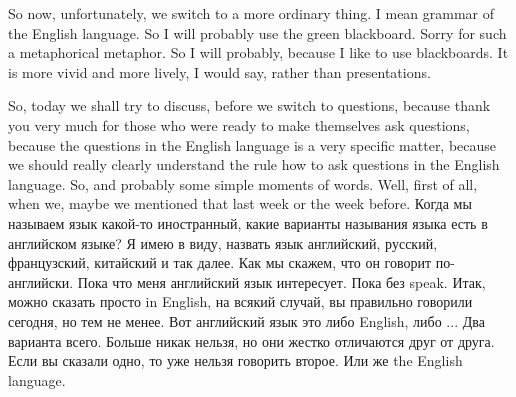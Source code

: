 \documentclass[main.tex]{subfiles}
\begin{document}
So now, unfortunately, we switch to a more ordinary thing.
I mean grammar of the English language.
So I will probably use the green blackboard.
Sorry for such a metaphorical metaphor.
So I will probably, because I like to use blackboards.
It is more vivid and more lively, I would say, rather than presentations.

So, today we shall try to discuss, before we switch to questions, because thank you very much for those who were ready to make themselves ask questions, because the questions in the English language is a very specific matter, because we should really clearly understand the rule how to ask questions in the English language.
So, and probably some simple moments of words.
Well, first of all, when we, maybe we mentioned that last week or the week before.
Когда мы называем язык какой-то иностранный, какие варианты называния языка есть в английском языке?
Я имею в виду, назвать язык английский, русский, французский, китайский и так далее.
Как мы скажем, что он говорит по-английски.
Пока что меня английский язык интересует.
Пока без speak.
Итак, можно сказать просто in English, на всякий случай, вы правильно говорили сегодня, но тем не менее.
Вот английский язык это либо English, либо ...
Два варианта всего.
Больше никак нельзя, но они жестко отличаются друг от друга.
Если вы сказали одно, то уже нельзя говорить второе.
Или же the English language.
\end{document}
